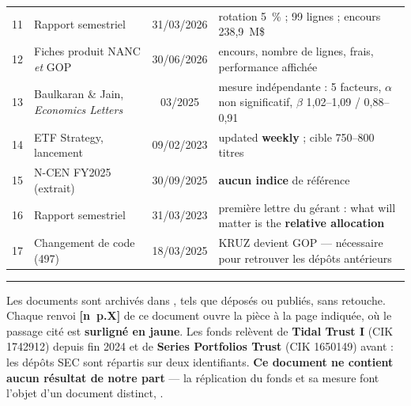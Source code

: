 \documentclass[9pt,a4paper]{extarticle}
\begin{document}
{\begin{tabular}{@{}c R{3.4cm} c R{9.0cm}@{}}
11 & Rapport semestriel & 31/03/2026 & rotation 5~\% ; 99 lignes ; encours 238,9~M\$ \\
12 & Fiches produit NANC \emph{et} GOP & 30/06/2026 & encours, nombre de lignes, frais, performance affichée \\
13 & Baulkaran \& Jain, \emph{Economics Letters} & 03/2025 & mesure indépendante : 5 facteurs, $\alpha$ non significatif, $\beta$ 1,02--1,09 / 0,88--0,91 \\
14 & ETF Strategy, lancement & 09/02/2023 & \og{}updated \textbf{weekly}\fg{} ; cible 750--800 titres \\
15 & N-CEN FY2025 (extrait) & 30/09/2025 & \textbf{aucun indice} de référence \\
16 & Rapport semestriel & 31/03/2023 & première lettre du gérant : \og{}what will matter is the \textbf{relative allocation}\fg{} \\
17 & Changement de code (497) & 18/03/2025 & KRUZ devient GOP --- nécessaire pour retrouver les dépôts antérieurs \\
\bottomrule
\end{tabular}\par}

\vspace{1.5mm}\hrule\vspace{1mm}
{\scriptsize\color{grisf} Les documents sont archivés dans , tels que déposés ou publiés,
sans retouche. Chaque renvoi \textbf{[n~p.X]} de ce document ouvre la pièce à la page indiquée, où le passage cité
est \textbf{surligné en jaune}. Les fonds relèvent de \textbf{Tidal Trust I} (CIK 1742912) depuis fin 2024 et de
\textbf{Series Portfolios Trust} (CIK 1650149) avant : les dépôts SEC sont répartis sur deux identifiants.
\textbf{Ce document ne contient aucun résultat de notre part} --- la réplication du fonds et sa mesure font
l'objet d'un document distinct, .\par}
\end{document}
